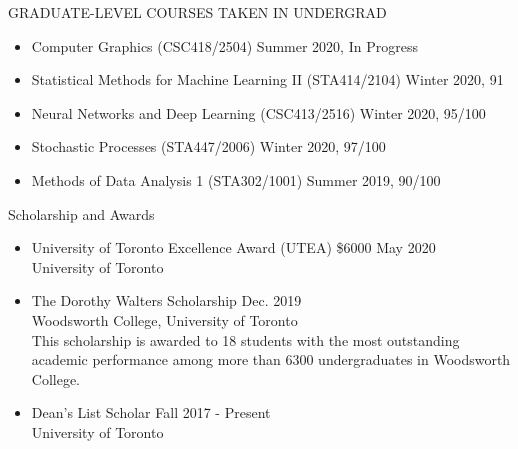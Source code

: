 \documentclass{resume} %
\newcommand{\tab}[1]{\hspace{.2667\textwidth}\rlap{#1}}
\newcommand{\itab}[1]{\hspace{0em}\rlap{#1}}
\begin{document}
\begin{rSection}{GRADUATE-LEVEL COURSES TAKEN IN UNDERGRAD}
\begin{itemize}
	\item Computer Graphics (CSC418/2504) \hfill{Summer 2020, In Progress}
	\item Statistical Methods for Machine Learning II (STA414/2104) \hfill{Winter 2020, 91}
	\item Neural Networks and Deep Learning (CSC413/2516) \hfill{Winter 2020, 95/100}
	\item Stochastic Processes (STA447/2006) \hfill{Winter 2020, 97/100}
	\item Methods of Data Analysis 1 (STA302/1001) \hfill{Summer 2019, 90/100}
\end{itemize}
\end{rSection}

\begin{rSection}{Scholarship and Awards}
\begin{itemize}
	\item University of Toronto Excellence Award (UTEA) \$6000 \hfill{May 2020}\\
	University of Toronto
	\item The Dorothy Walters Scholarship \hfill{Dec. 2019}\\
	Woodsworth College, University of Toronto\\
	This scholarship is awarded to 18 students with the most outstanding academic performance among more than 6300 undergraduates in Woodsworth College.
	\item Dean's List Scholar \hfill{Fall 2017 - Present}\\
	University of Toronto
\end{itemize}
\end{rSection}
\end{document}
